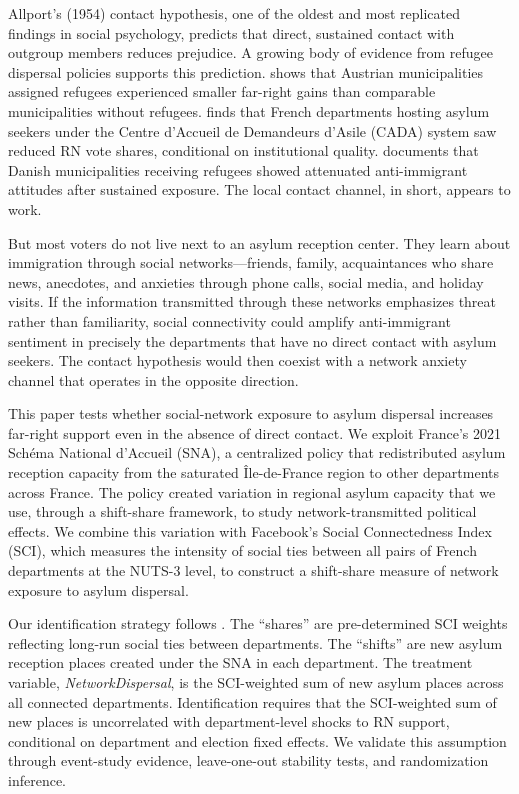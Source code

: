 \documentclass[12pt]{article}
\begin{document}
Allport's (1954) contact hypothesis, one of the oldest and most replicated findings in social psychology, predicts that direct, sustained contact with outgroup members reduces prejudice. A growing body of evidence from refugee dispersal policies supports this prediction. \citet{steinmayr2021contact} shows that Austrian municipalities assigned refugees experienced smaller far-right gains than comparable municipalities without refugees. \citet{schneider2024stranger} finds that French departments hosting asylum seekers under the Centre d'Accueil de Demandeurs d'Asile (CADA) system saw reduced RN vote shares, conditional on institutional quality. \citet{dustmann2019refugee} documents that Danish municipalities receiving refugees showed attenuated anti-immigrant attitudes after sustained exposure. The local contact channel, in short, appears to work.

But most voters do not live next to an asylum reception center. They learn about immigration through social networks---friends, family, acquaintances who share news, anecdotes, and anxieties through phone calls, social media, and holiday visits. If the information transmitted through these networks emphasizes threat rather than familiarity, social connectivity could amplify anti-immigrant sentiment in precisely the departments that have no direct contact with asylum seekers. The contact hypothesis would then coexist with a network anxiety channel that operates in the opposite direction.

This paper tests whether social-network exposure to asylum dispersal increases far-right support even in the absence of direct contact. We exploit France's 2021 Sch\'ema National d'Accueil (SNA), a centralized policy that redistributed asylum reception capacity from the saturated \^Ile-de-France region to other departments across France. The policy created variation in regional asylum capacity that we use, through a shift-share framework, to study network-transmitted political effects. We combine this variation with Facebook's Social Connectedness Index (SCI), which measures the intensity of social ties between all pairs of French departments at the NUTS-3 level, to construct a shift-share measure of network exposure to asylum dispersal.

Our identification strategy follows \citet{borusyak2022quasi}. The ``shares'' are pre-determined SCI weights reflecting long-run social ties between departments. The ``shifts'' are new asylum reception places created under the SNA in each department. The treatment variable, \textit{NetworkDispersal}, is the SCI-weighted sum of new asylum places across all connected departments. Identification requires that the SCI-weighted sum of new places is uncorrelated with department-level shocks to RN support, conditional on department and election fixed effects. We validate this assumption through event-study evidence, leave-one-out stability tests, and randomization inference.
\end{document}
